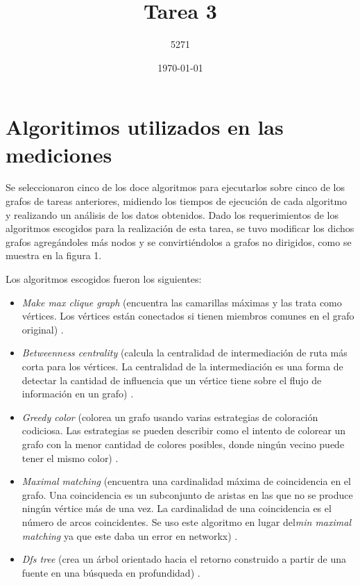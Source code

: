 \documentclass{article}
\title{Tarea 3}
\author{5271}
\date{\today}
\begin{document}
\maketitle

\section{Algoritimos utilizados en las mediciones}

Se seleccionaron cinco de los doce algoritmos para ejecutarlos sobre cinco de los grafos de tareas anteriores, midiendo los tiempos de ejecución de cada algoritmo y realizando un análisis de los datos obtenidos. Dado los requerimientos de los algoritmos escogidos para la realización de esta tarea, se tuvo modificar los dichos grafos agregándoles más nodos y se convirtiéndolos a grafos no dirigidos, como se muestra en la figura 1.
 
Los algoritmos escogidos fueron los siguientes:

\begin{itemize}
 \item\textit{Make max clique graph} (encuentra las camarillas máximas y las trata como vértices. Los vértices  están conectados si tienen miembros comunes en el grafo original)  \cite{mc}.  
 \item\textit{Betweenness centrality} (calcula la centralidad de intermediación de ruta más corta para los vértices. La centralidad de la intermediación es una forma de detectar la cantidad de influencia que un vértice tiene sobre el flujo de información en un grafo) \cite{bct}.
	\item\textit{Greedy color} (colorea un grafo usando varias estrategias de coloración codiciosa. Las estrategias se pueden describir como el intento de colorear un grafo con la menor cantidad de colores posibles, donde ningún vecino puede tener el mismo color) \cite{gc}.
	\item\textit{Maximal matching} (encuentra una cardinalidad máxima de coincidencia en el grafo. Una coincidencia es un subconjunto de aristas en las que no se produce ningún vértice más de una vez. La cardinalidad de una coincidencia es el número de arcos coincidentes. Se uso este algoritmo en lugar del\textit{min maximal matching} ya que este daba un error en networkx) \cite{mm}.
	\item\textit{Dfs tree} (crea un árbol orientado hacia el retorno construido a partir de una fuente en una búsqueda en profundidad) \cite{dt}.
\end{itemize}
\begin{center}

\end{center}
\end{document}
